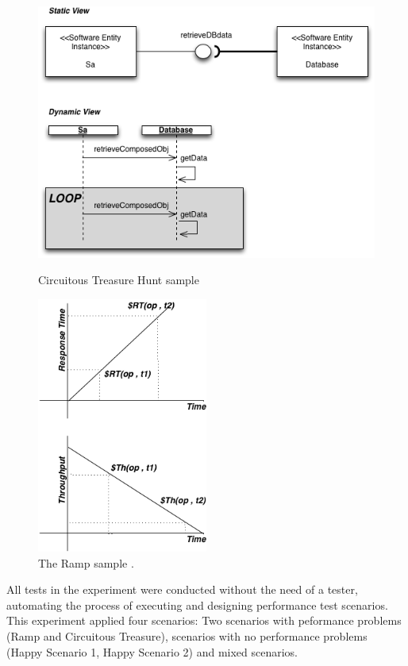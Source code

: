 \begin{figure}[h]
\begin{minipage}{.5\textwidth}
\centering
\includegraphics[width=1\textwidth]{./images/circuit.png}
\caption{Circuitous
Treasure Hunt sample \cite{Vetoio2011}}
\label{fig:circuit}
\end{minipage}
\begin{minipage}{.5\textwidth}
\centering
\includegraphics[width=0.5\textwidth]{./images/ramp.png}
\caption{The Ramp sample \cite{Vetoio2011}.}
\label{fig:ramp}
\end{minipage}
\end{figure}



All tests in the experiment were conducted without the need of a tester, automating the process of executing and designing performance test scenarios. This experiment applied four scenarios: Two scenarios with peformance problems (Ramp and Circuitous Treasure), scenarios with no performance problems (Happy Scenario 1, Happy Scenario 2) and mixed scenarios. 

